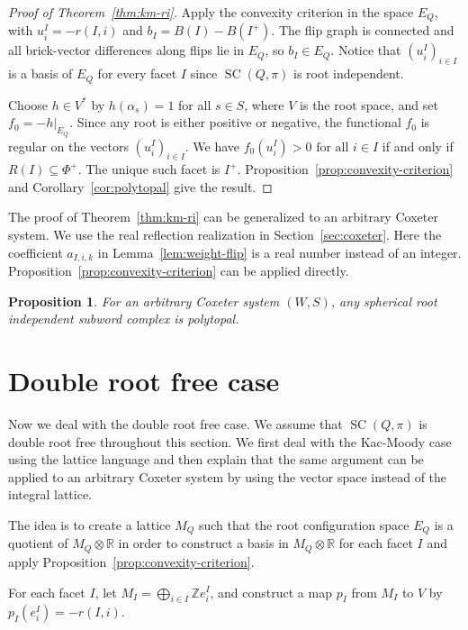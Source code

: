\documentclass[11pt,a4paper]{article}
\newtheorem{proposition}[theorem]{Proposition}
\theoremstyle{definition}
\theoremstyle{remark}
\newcommand{\SC}{\operatorname{SC}}
\numberwithin{equation}{section}
\newcommand{\SCQ}{\operatorname{SC}(Q,\pi)}
\newcommand{\Z}{\mathbb Z}
\begin{document}
\begin{proof}[Proof of Theorem~\ref{thm:km-ri}]
Apply the convexity criterion in the space $E_Q$, with $u_i^I=-r(I,i)$ and $b_I=B(I)-B(I^+)$.
The flip graph is connected and all brick-vector
differences along flips lie in $E_Q$, so $b_I\in E_Q$.
Notice that $(u_i^I)_{i\in I}$ is a basis of $E_Q$ for every facet $I$ since $\SCQ$ is root independent.

Choose $h\in V^*$ by $h(\alpha_s)=1$ for all $s\in S$,
where $V$ is the root space, and set $f_0=-h|_{E_Q}$.
Since any root is either positive or negative, the functional $f_0$ is regular on the vectors $(u_i^I)_{i\in I}$. We have $f_0(u_i^I)>0\text{ for all }i\in I$ if and only if $R(I)\subseteq\Phi^+$. The unique such facet is $I^+$. Proposition~\ref{prop:convexity-criterion} and Corollary~\ref{cor:polytopal} give the result.
\end{proof}

The proof of Theorem~\ref{thm:km-ri} can be generalized to an arbitrary Coxeter system. We use the real reflection realization in Section~\ref{sec:coxeter}. Here the coefficient $a_{I,i,k}$ in Lemma~\ref{lem:weight-flip} is a real number instead of an integer. Proposition~\ref{prop:convexity-criterion} can be applied directly.
\begin{proposition}\label{prop:general-realization}
    For an arbitrary Coxeter system $(W,S)$, any spherical root independent subword complex is polytopal.
\end{proposition}

\section{Double root free case}\label{sec:double}
Now we deal with the double root free case. We assume that $\SC (Q,\pi)$ is double root free throughout this section. We first deal with the Kac-Moody case using the lattice language and then explain that the same argument can be applied to an arbitrary Coxeter system by using the vector space instead of the integral lattice. 

The idea is to create a lattice $M_Q$ such that the root configuration space $E_Q$ is a quotient of $M_Q\otimes\mathbb{R}$ in order to construct a basis in $M_Q\otimes\mathbb{R}$ for each facet $I$ and apply Proposition~\ref{prop:convexity-criterion}.

For each facet $I$, let $M_I=\bigoplus_{i\in I}\Z e_i^I$, and construct a map $p_I$ from $M_I$ to $V$ by $p_I(e_i^I)=-r(I,i)$.
\end{document}
